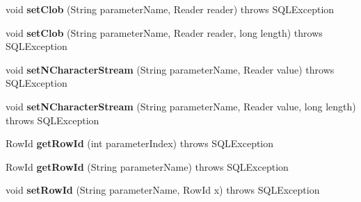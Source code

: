 \begin{DoxyCompactItemize}
\item 
\mbox{\label{classcom_1_1mysql_1_1cj_1_1jdbc_1_1_callable_statement_a4e6b7cc4dbd931dcb5bb35e40930ef23}} 
void {\bfseries set\+Clob} (String parameter\+Name, Reader reader)  throws S\+Q\+L\+Exception 
\item 
\mbox{\label{classcom_1_1mysql_1_1cj_1_1jdbc_1_1_callable_statement_a6ea81378f64a3c5addddf379adef7dff}} 
void {\bfseries set\+Clob} (String parameter\+Name, Reader reader, long length)  throws S\+Q\+L\+Exception 
\item 
\mbox{\label{classcom_1_1mysql_1_1cj_1_1jdbc_1_1_callable_statement_af60f91b86793a9898354b76d75ab0867}} 
void {\bfseries set\+N\+Character\+Stream} (String parameter\+Name, Reader value)  throws S\+Q\+L\+Exception 
\item 
\mbox{\label{classcom_1_1mysql_1_1cj_1_1jdbc_1_1_callable_statement_a0d7753d1fc9fa30f0f26d609ef503da0}} 
void {\bfseries set\+N\+Character\+Stream} (String parameter\+Name, Reader value, long length)  throws S\+Q\+L\+Exception 
\item 
\mbox{\label{classcom_1_1mysql_1_1cj_1_1jdbc_1_1_callable_statement_a8a45432648ac87e351ce860544fc93b3}} 
Row\+Id {\bfseries get\+Row\+Id} (int parameter\+Index)  throws S\+Q\+L\+Exception 
\item 
\mbox{\label{classcom_1_1mysql_1_1cj_1_1jdbc_1_1_callable_statement_aecaec5ce03bfdda6b57a3373b0739f25}} 
Row\+Id {\bfseries get\+Row\+Id} (String parameter\+Name)  throws S\+Q\+L\+Exception 
\item 
\mbox{\label{classcom_1_1mysql_1_1cj_1_1jdbc_1_1_callable_statement_a9a486e03a6a47d24e474cd305f93e729}} 
void {\bfseries set\+Row\+Id} (String parameter\+Name, Row\+Id x)  throws S\+Q\+L\+Exception 
\item 
\mbox{\label{classcom_1_1mysql_1_1cj_1_1jdbc_1_1_callable_statement_aafb9f5d4c8dd0ff100d2dd24b530a274}} 

\end{DoxyCompactItemize}
